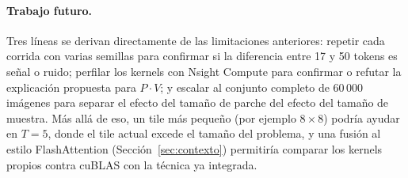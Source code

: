 \documentclass[11pt,a4paper]{article}
\begin{document}
\paragraph{Trabajo futuro.} Tres líneas se derivan directamente de las
limitaciones anteriores: repetir cada corrida con varias semillas para
confirmar si la diferencia entre 17 y 50 tokens es señal o ruido; perfilar
los kernels con Nsight Compute para confirmar o refutar la explicación
propuesta para $P\cdot V$; y escalar al conjunto completo de $60\,000$
imágenes para separar el efecto del tamaño de parche del efecto del tamaño de
muestra. Más allá de eso, un tile más pequeño (por ejemplo $8\times8$) podría
ayudar en $T=5$, donde el tile actual excede el tamaño del problema, y una
fusión al estilo FlashAttention (Sección~\ref{sec:contexto}) permitiría
comparar los kernels propios contra cuBLAS con la técnica ya integrada.

{\small

}
\end{document}
